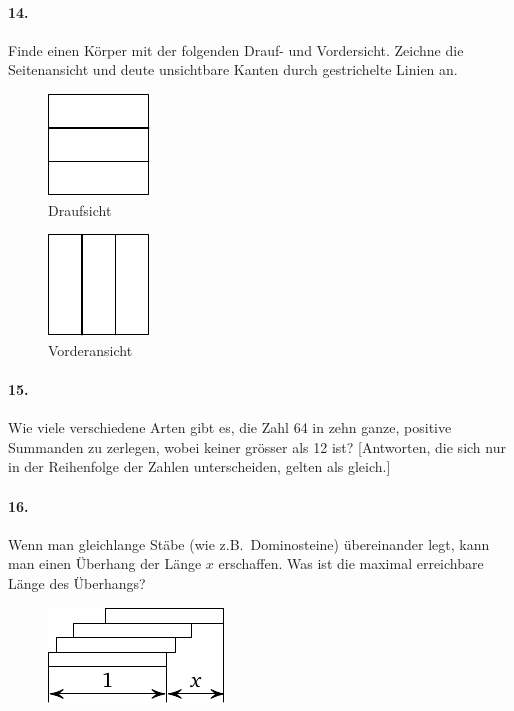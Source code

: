 \documentclass[10pt,a5paper,twoside]{article}
\newenvironment{problem}[1]{\paragraph*{#1}}{}
\begin{document}
\begin{problem}{14.}
	Finde einen Körper mit der folgenden Drauf- und Vordersicht. Zeichne die Seitenansicht  und deute unsichtbare Kanten durch gestrichelte Linien an. 
	\begin{figure}[H]
	\footnotesize
	\null\hfill
	\parbox{0.2\linewidth}{\centering\includegraphics[scale=1]{taskbook-99}\\Draufsicht}
	\hfill
	\parbox{0.2\linewidth}{\centering\includegraphics[scale=1]{taskbook-98}\\Vorderansicht}
	\hfill\null
	\end{figure}
\end{problem}

\begin{problem}{15.}
	Wie viele verschiedene Arten gibt es, die Zahl 64 in zehn ganze, positive Summanden zu zerlegen, wobei keiner grösser als 12 ist?
	[Antworten, die sich nur in der Reihenfolge der Zahlen unterscheiden, gelten als gleich.]
\end{problem}

\begin{problem}{16.}
	Wenn man gleichlange Stäbe (wie z.B.\ Dominosteine) übereinander legt, kann man einen Überhang der Länge $x$ erschaffen. Was ist die maximal er\-reich\-ba\-re Länge des Überhangs? 
	\begin{figure}[H]
	\centering
	\includegraphics[scale=1]{taskbook-97}
	\end{figure}
\end{problem}
\end{document}
